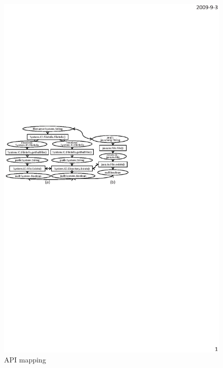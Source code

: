 \begin{figure}[t]
\centering %
\includegraphics[scale=0.95,clip]{figure/sample.eps}\vspace*{-3ex}
 \caption{\label{fig:example}API mapping}\vspace*{-3ex}
\end{figure}

